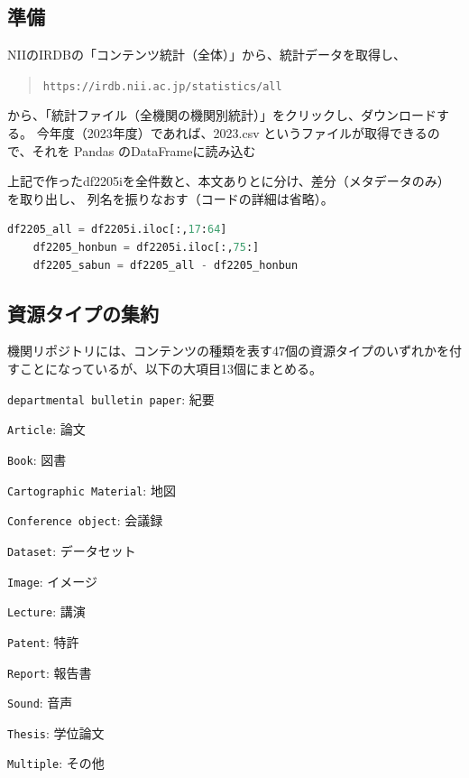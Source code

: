 \documentclass[submit,noauthor]{ono}
\def\|{\verb|}
\begin{document}
\subsection{準備}

NIIのIRDBの「コンテンツ統計（全体）」から、統計データを取得し、
\begin{quote}
	\small
	\|https://irdb.nii.ac.jp/statistics/all|
\end{quote}
から、「統計ファイル（全機関の機関別統計）」をクリックし、ダウンロードする。
今年度（2023年度）であれば、2023.csv というファイルが取得できるので、それを
Pandas のDataFrameに読み込む

上記で作ったdf2205iを全件数と、本文ありとに分け、差分（メタデータのみ）を取り出し、
列名を振りなおす（コードの詳細は省略）。

\begin{lstlisting}[language=Python,breaklines,caption=hoge,label=fuga]
	df2205_all = df2205i.iloc[:,17:64]
	df2205_honbun = df2205i.iloc[:,75:]
	df2205_sabun = df2205_all - df2205_honbun
\end{lstlisting}


\subsection{資源タイプの集約}
機関リポジトリには、コンテンツの種類を表す47個の資源タイプのいずれかを付すことになっているが、以下の大項目13個にまとめる。

\begin{Enumerate}
	\item \|departmental bulletin paper|: 紀要
	\item \|Article|: 論文
	\item \|Book|: 図書
	\item \|Cartographic Material|: 地図
	\item \|Conference object|: 会議録
	\item \|Dataset|: データセット
	\item \|Image|: イメージ
	\item \|Lecture|: 講演
	\item \|Patent|: 特許
	\item \|Report|: 報告書
	\item \|Sound|: 音声
	\item \|Thesis|: 学位論文
	\item \|Multiple|: その他
\end{Enumerate}%
\end{document}
